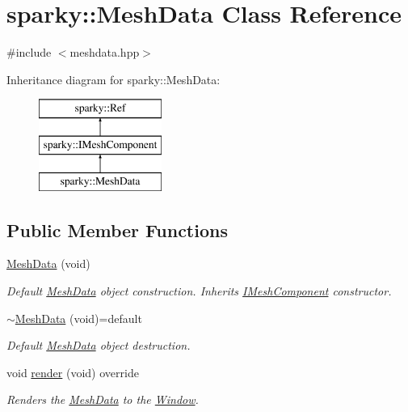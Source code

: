 \hypertarget{classsparky_1_1_mesh_data}{}\section{sparky\+:\+:Mesh\+Data Class Reference}
\label{classsparky_1_1_mesh_data}


{\ttfamily \#include $<$meshdata.\+hpp$>$}

Inheritance diagram for sparky\+:\+:Mesh\+Data\+:\begin{figure}[H]
\begin{center}
\leavevmode
\includegraphics[height=3.000000cm]{classsparky_1_1_mesh_data}
\end{center}
\end{figure}
\subsection*{Public Member Functions}
\begin{DoxyCompactItemize}
\item 
\hyperlink{classsparky_1_1_mesh_data_a1cb26acf4e5303ada166beeedfe2bb49}{Mesh\+Data} (void)\hypertarget{classsparky_1_1_mesh_data_a1cb26acf4e5303ada166beeedfe2bb49}{}\label{classsparky_1_1_mesh_data_a1cb26acf4e5303ada166beeedfe2bb49}

\begin{DoxyCompactList}\small\item\em Default \hyperlink{classsparky_1_1_mesh_data}{Mesh\+Data} object construction. Inherits \hyperlink{classsparky_1_1_i_mesh_component}{I\+Mesh\+Component} constructor. \end{DoxyCompactList}\item 
\hyperlink{classsparky_1_1_mesh_data_ac62e17d43cbde022d9a2da7bb234024d}{$\sim$\+Mesh\+Data} (void)=default\hypertarget{classsparky_1_1_mesh_data_ac62e17d43cbde022d9a2da7bb234024d}{}\label{classsparky_1_1_mesh_data_ac62e17d43cbde022d9a2da7bb234024d}

\begin{DoxyCompactList}\small\item\em Default \hyperlink{classsparky_1_1_mesh_data}{Mesh\+Data} object destruction. \end{DoxyCompactList}\item 
void \hyperlink{classsparky_1_1_mesh_data_a38c127564baa1fb1f3e690d5afe3246c}{render} (void) override
\begin{DoxyCompactList}\small\item\em Renders the \hyperlink{classsparky_1_1_mesh_data}{Mesh\+Data} to the \hyperlink{classsparky_1_1_window}{Window}. \end{DoxyCompactList}\end{DoxyCompactItemize}
